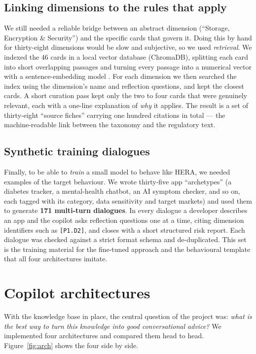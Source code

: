 \documentclass[11pt]{article}
\begin{document}
\subsection{Linking dimensions to the rules that apply}

We still needed a reliable bridge between an abstract dimension (``Storage, Encryption \&
Security'') and the specific cards that govern it. Doing this by hand for thirty-eight
dimensions would be slow and subjective, so we used \emph{retrieval}. We indexed the 46
cards in a local vector database (ChromaDB), splitting each card into short overlapping
passages and turning every passage into a numerical vector with a sentence-embedding
model \citep{reimers2019sentencebert,xiao2024cpack}. For each dimension we then searched
the index using the dimension's name and reflection questions, and kept the closest
cards. A short curation pass kept only the two to four cards that were genuinely
relevant, each with a one-line explanation of \emph{why} it applies. The result is a set
of thirty-eight ``source fiches'' carrying one hundred citations in total --- the
machine-readable link between the taxonomy and the regulatory text.

\subsection{Synthetic training dialogues}

Finally, to be able to \emph{train} a small model to behave like HERA, we needed
examples of the target behaviour. We wrote thirty-five app ``archetypes'' (a diabetes
tracker, a mental-health chatbot, an AI symptom checker, and so on, each tagged with its
category, data sensitivity and target markets) and used them to generate
\textbf{171 multi-turn dialogues}. In every dialogue a developer describes an app and the
copilot asks reflection questions one at a time, citing dimension identifiers such as
\texttt{[P1.D2]}, and closes with a short structured risk report. Each dialogue was
checked against a strict format schema and de-duplicated. This set is the training
material for the fine-tuned approach and the behavioural template that all four
architectures imitate.

\section{Copilot architectures}
\label{sec:arch}

With the knowledge base in place, the central question of the project was: \emph{what is
the best way to turn this knowledge into good conversational advice?} We implemented four
architectures and compared them head to head. Figure~\ref{fig:arch} shows the four side
by side.
\end{document}

